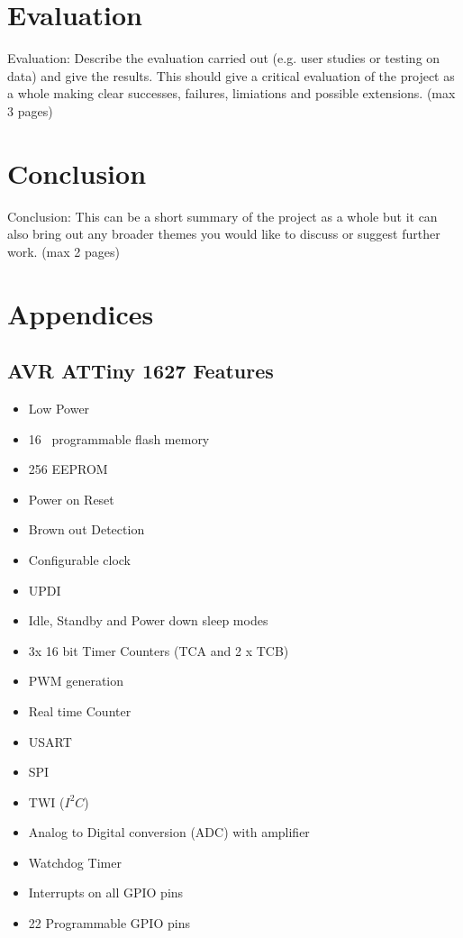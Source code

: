 \documentclass[11pt,a4paper,titlepage]{report}
\begin{document}
	\chapter*{Evaluation}
	Evaluation: Describe the evaluation carried out (e.g. user studies or testing on data) and give the results. This should give a critical evaluation of the project as a whole making clear successes, failures, limiations and possible extensions. (max 3 pages)
	
	\chapter*{Conclusion}
	Conclusion: This can be a short summary of the project as a whole but it can also bring out any broader themes you would like to discuss or suggest further work. (max 2 pages)
	
	\chapter*{Appendices}
	\section{AVR ATTiny 1627 Features}\label{appendix:attiny_features}
	\begin{itemize}
		\item Low Power
		\item 16\unit{\kilo\byte} programmable flash memory
		\item 256\unit{\byte} EEPROM
		\item Power on Reset
		\item Brown out Detection
		\item Configurable clock
		\item UPDI
		\item Idle, Standby and Power down sleep modes
		\item 3x 16 bit Timer Counters (TCA and 2 x TCB)
		\item PWM generation
		\item Real time Counter
		\item USART
		\item SPI
		\item TWI ($I^{2}C$)
		\item Analog to Digital conversion (ADC) with amplifier
		\item Watchdog Timer
		\item Interrupts on all GPIO pins
		\item 22 Programmable GPIO pins
	\end{itemize}
	
\end{document}

